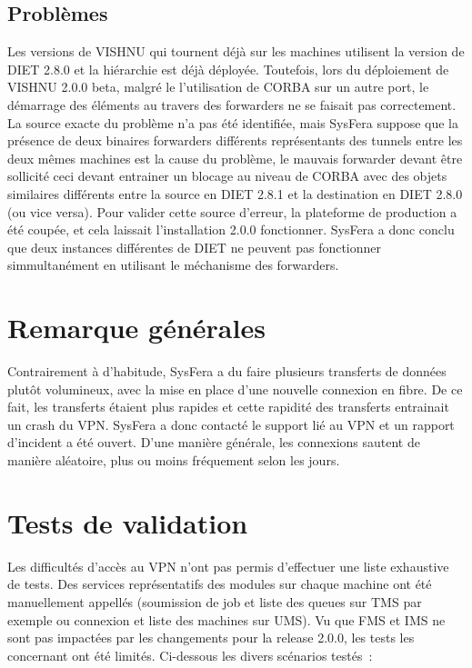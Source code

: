 \documentclass{article}
\begin{document}
\subsection{Probl\`emes}
Les versions de VISHNU qui tournent d\'ej\`a sur les machines utilisent
la version de DIET 2.8.0 et la hi\'erarchie est d\'ej\`a d\'eploy\'ee.
Toutefois, lors du d\'eploiement de VISHNU 2.0.0 beta, malgré le 
l'utilisation de CORBA sur un autre port, le démarrage des 
\'el\'ements au travers des forwarders ne se faisait pas correctement.
La source exacte du probl\`eme n'a pas \'et\'e identifi\'ee, mais 
SysFera suppose que la pr\'esence de deux binaires forwarders diff\'erents
repr\'esentants des tunnels entre les deux m\^emes machines est la
cause du probl\`eme, le mauvais forwarder devant \^etre sollicit\'e 
ceci devant entrainer un blocage au niveau de CORBA avec des objets 
similaires diff\'erents entre la source en DIET 2.8.1 et la destination
en DIET 2.8.0 (ou vice versa). 
Pour valider cette source d'erreur, la plateforme de production a 
\'et\'e coup\'ee, et cela laissait l'installation 2.0.0 fonctionner.
SysFera a donc conclu que deux instances diff\'erentes de DIET ne peuvent 
pas fonctionner simmultan\'ement en utilisant le m\'echanisme des
forwarders.

\section{Remarque g\'en\'erales}
Contrairement \`a d'habitude, SysFera a du faire plusieurs 
transferts de donn\'ees plut\^ot volumineux, avec la mise en
place d'une nouvelle connexion en fibre. De ce fait, les 
transferts \'etaient plus rapides et cette rapidit\'e des 
transferts entrainait un crash du VPN. SysFera a donc
contact\'e le support li\'e au VPN et un rapport d'incident 
a \'et\'e ouvert. D'une mani\`ere g\'en\'erale, les connexions sautent
de mani\`ere al\'eatoire, plus ou moins fr\'equement selon les jours.

\section{Tests de validation}

Les difficultés d'accès au VPN n'ont pas permis d'effectuer une liste exhaustive de tests. Des services repr\'esentatifs des modules 
sur chaque machine ont \'et\'e manuellement appell\'es 
(soumission de job et liste des queues sur TMS par exemple ou 
connexion et liste des machines sur UMS). Vu que FMS et IMS ne sont
pas impact\'ees par les changements pour la release 2.0.0, les tests
les concernant ont \'et\'e limit\'es.
Ci-dessous les divers sc\'enarios test\'es~:
\end{document}
